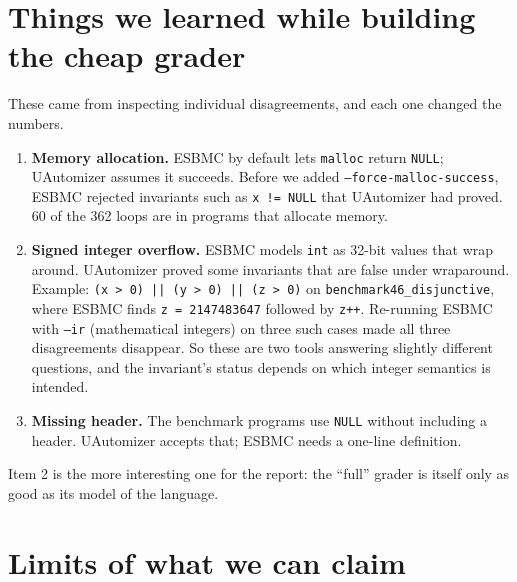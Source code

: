 \documentclass[11pt]{article}
\newcommand{\code}[1]{\texttt{#1}}
\begin{document}
\section{Things we learned while building the cheap grader}\label{sec:learned}

These came from inspecting individual disagreements, and each one changed the numbers.

\begin{enumerate}
\item \textbf{Memory allocation.} ESBMC by default lets \code{malloc} return \code{NULL};
UAutomizer assumes it succeeds. Before we added \code{--force-malloc-success}, ESBMC rejected
invariants such as \code{x != NULL} that UAutomizer had proved. 60 of the 362 loops are in
programs that allocate memory.
\item \textbf{Signed integer overflow.} ESBMC models \code{int} as 32-bit values that wrap
around. UAutomizer proved some invariants that are false under wraparound. Example:
\code{(x > 0) || (y > 0) || (z > 0)} on \code{benchmark46\_disjunctive}, where ESBMC finds
\code{z = 2147483647} followed by \code{z++}. Re-running ESBMC with \code{--ir} (mathematical
integers) on three such cases made all three disagreements disappear. So these are two tools
answering slightly different questions, and the invariant's status depends on which integer
semantics is intended.
\item \textbf{Missing header.} The benchmark programs use \code{NULL} without including a header.
UAutomizer accepts that; ESBMC needs a one-line definition.
\end{enumerate}

Item 2 is the more interesting one for the report: the ``full'' grader is itself only as good as
its model of the language.

\section{Limits of what we can claim}\label{sec:limits}
\end{document}
